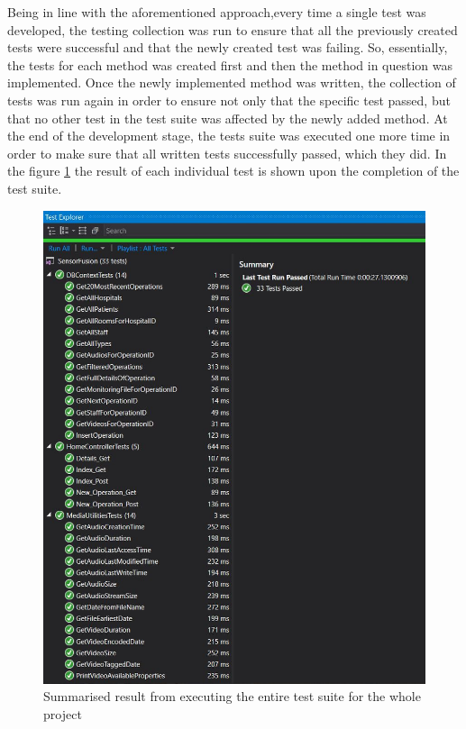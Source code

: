 Being in line with the aforementioned approach,every time a single test was developed, the testing collection was run to ensure that all the previously created tests were successful and that the newly created test was failing. So, essentially, the tests for each method was created first and then the method in question was implemented. Once the newly implemented method was written, the collection of tests was run again in order to ensure not only that the specific test passed, but that no other test in the test suite was affected by the newly added method. At the end of the development stage, the tests suite was executed one more time in order to make sure that all written tests successfully passed, which they did. In the figure \ref{unit_tests} the result of each individual test is shown upon the completion of the test suite.


\begin{figure}[!ht]
\begin{center}
\includegraphics[width=17cm]{imgs/unit_tests.jpg}
\end{center}\vspace{-0.3cm}
\caption[Unit Test Report]{Summarised result from executing the entire test suite for the whole project} \label{unit_tests}
\end{figure}



